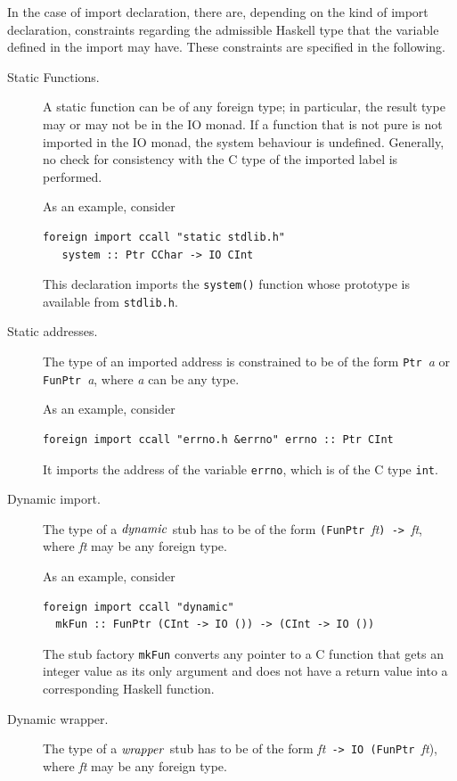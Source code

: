 In the case of import declaration, there are, depending on the kind of import
declaration, constraints regarding the admissible Haskell type that the
variable defined in the import may have.  These constraints are specified in
the following.
%
\begin{description}
\item[Static Functions.]  A static function can be of any foreign type; in
  particular, the result type may or may not be in the IO monad.  If a
  function that is not pure is not imported in the IO monad, the system
  behaviour is undefined.  Generally, no check for consistency with the C type
  of the imported label is performed.

  As an example, consider
\bprog
{\small\begin{verbatim}
foreign import ccall "static stdlib.h"
   system :: Ptr CChar -> IO CInt
\end{verbatim}}
\eprog
  This declaration imports the \mbox{\tt system()} function whose prototype is
  available from \mbox{\tt stdlib.h}.

\item[Static addresses.]  The type of an imported address is constrained to be
  of the form \mbox{\tt Ptr\ }\textit{a} or \mbox{\tt FunPtr\ }\textit{a}, where
  \textit{a} can be any type.

  As an example, consider
\bprog
{\small\begin{verbatim}
foreign import ccall "errno.h &errno" errno :: Ptr CInt
\end{verbatim}}
\eprog
  It imports the address of the variable \mbox{\tt errno}, which is of the C type
  \mbox{\tt int}.

\item[Dynamic import.]  The type of a \mbox{$\it dynamic$} stub has to be of the
  form \mbox{\tt (FunPtr\ }\textit{ft}\mbox{\tt )\ ->\ }\textit{ft}, where \textit{ft} may
  be any foreign type.

  As an example, consider
\bprog
{\small\begin{verbatim}
foreign import ccall "dynamic" 
  mkFun :: FunPtr (CInt -> IO ()) -> (CInt -> IO ())
\end{verbatim}}
\eprog
  The stub factory \mbox{\tt mkFun} converts any pointer to a C function that gets
  an integer value as its only argument and does not have a return value into
  a corresponding Haskell function.

\item[Dynamic wrapper.]  The type of a \mbox{$\it wrapper$} stub has to be of the
  form \textit{ft}\mbox{\tt \ ->\ IO\ (FunPtr\ }\textit{ft}), where
  \textit{ft} may be any foreign type.


\end{description}
